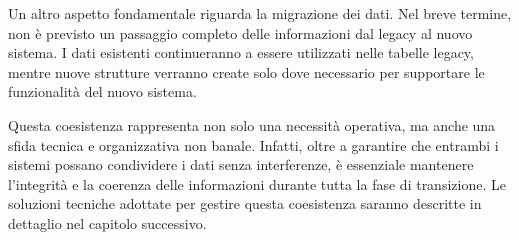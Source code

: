 Un altro aspetto fondamentale riguarda la migrazione dei dati. Nel breve termine, non è previsto un passaggio completo delle informazioni dal legacy al nuovo sistema. I dati esistenti continueranno a essere utilizzati nelle tabelle legacy, mentre nuove strutture verranno create solo dove necessario per supportare le funzionalità del nuovo sistema.

Questa coesistenza rappresenta non solo una necessità operativa, ma anche una sfida tecnica e organizzativa non banale. Infatti, oltre a garantire che entrambi i sistemi possano condividere i dati senza interferenze, è essenziale mantenere l’integrità e la coerenza delle informazioni durante tutta la fase di transizione. Le soluzioni tecniche adottate per gestire questa coesistenza saranno descritte in dettaglio nel capitolo successivo.
